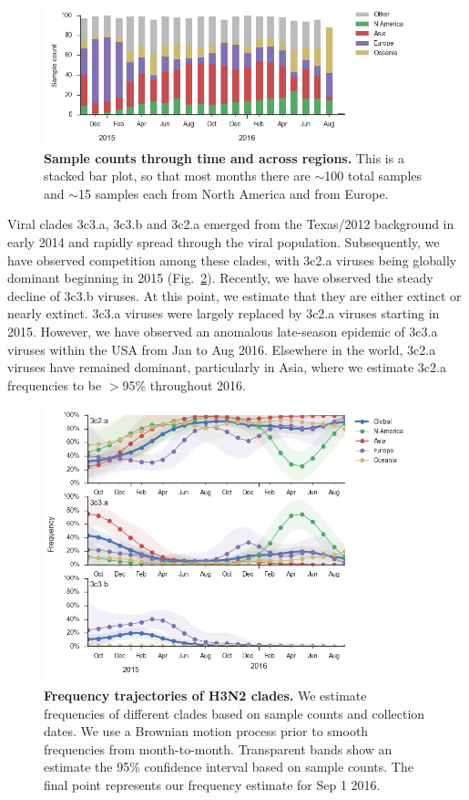 \documentclass[11pt,oneside,letterpaper]{article}
\begin{document}
\begin{figure}[H]
	\centering
	\includegraphics[width=0.95\textwidth]{../figures/sep-2016/H3N2_counts.png}
	\caption{\textbf{Sample counts through time and across regions.}
	This is a stacked bar plot, so that most months there are $\sim$100 total samples and $\sim$15 samples each from North America and from Europe.
	}
	\label{H3N2_counts}
\end{figure}

\pagebreak

Viral clades 3c3.a, 3c3.b and 3c2.a emerged from the Texas/2012 background in early 2014 and rapidly spread through the viral population. Subsequently, we have observed competition among these clades, with 3c2.a viruses being globally dominant beginning in 2015 (Fig.\ \ref{H3N2_clades}). Recently, we have observed the steady decline of 3c3.b viruses. At this point, we estimate that they are either extinct or nearly extinct. 3c3.a viruses were largely replaced by 3c2.a viruses starting in 2015. However, we have observed an anomalous late-season epidemic of 3c3.a viruses within the USA from Jan to Aug 2016. Elsewhere in the world, 3c2.a viruses have remained dominant, particularly in Asia, where we estimate 3c2.a frequencies to be $>$95\% throughout 2016.

\begin{figure}[H]
	\centering
	\includegraphics[width=0.95\textwidth]{../figures/sep-2016/H3N2_clades.png}
	\caption{\textbf{Frequency trajectories of H3N2 clades.}
	We estimate frequencies of different clades based on sample counts and collection dates.
	We use a Brownian motion process prior to smooth frequencies from month-to-month.
	Transparent bands show an estimate the 95\% confidence interval based on sample counts.
	The final point represents our frequency estimate for Sep 1 2016.
	}
	\label{H3N2_clades}
\end{figure}
\end{document}
